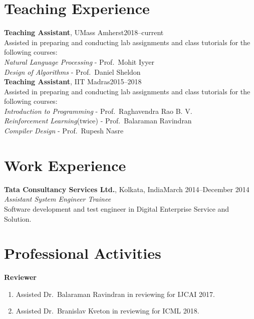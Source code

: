 \documentclass[margin,11pt]{res}
\begin{document}
\begin{resume}
\section{Teaching Experience}
\par
\textbf{Teaching Assistant}, UMass Amherst\hfill 2018--current\\
Assisted in preparing and conducting lab assignments and class tutorials for the following courses:\\
\textit{Natural Language Processing} - Prof.~Mohit Iyyer\\
\textit{Design of Algorithms} - Prof.~Daniel Sheldon\\
\textbf{Teaching Assistant}, IIT Madras\hfill 2015--2018\\
Assisted in preparing and conducting lab assignments and class tutorials for the following courses:\\
\textit{Introduction to Programming} - Prof.~Raghavendra Rao B. V. \\
\textit{Reinforcement Learning}(twice) - Prof.~Balaraman Ravindran\\
\textit{Compiler Design} - Prof.~Rupesh Nasre

\section{Work Experience}
\textbf{Tata Consultancy Services Ltd.}, Kolkata, India\hfill March 2014--December 2014\\
\textit{Assistant System Engineer Trainee}\\
Software development and test engineer in Digital Enterprise Service and Solution.


\section{Professional Activities}
\textbf{Reviewer} 
\begin{enumerate}
\item Assisted Dr.~Balaraman Ravindran in reviewing for IJCAI 2017.
\item Assisted Dr.~Branislav Kveton in reviewing for ICML 2018.
\end{enumerate}


\end{resume}
\end{document}
